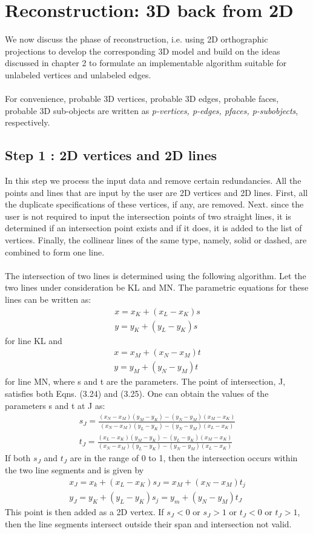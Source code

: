 \documentclass[
11pt, %
english, %
singlespacing, %
headsepline, %
]{MastersDoctoralThesis} %
\begin{document}
\section{Reconstruction: 3D back from 2D}
We now discuss the phase of reconstruction, i.e. using 2D orthographic projections to develop the corresponding 3D model and build on the ideas discussed in chapter 2 to formulate an implementable algorithm suitable for unlabeled vertices and unlabeled edges.\\ \\
 For convenience, probable 3D vertices, probable 3D edges, probable faces, probable 3D sub-objects are written as \emph{p-vertices, p-edges, pfaces,
p-subobjects}, respectively. 
\subsection{Step 1 : 2D vertices and 2D lines}
In this step we process the input data and remove certain redundancies. All the points and lines that are input by the user are 2D vertices and 2D lines. First, all the duplicate specifications of these vertices, if any,
are removed. Next. since the user is not required to input the intersection points of two straight lines, it is determined if an intersection point exists and if it does, it is added to the list of vertices. Finally, the collinear lines of the same type, namely, solid or dashed, are combined to form one line. \\ \\
The intersection of two lines is determined using the following algorithm. Let the two lines under consideration be KL and MN. The parametric equations
for these lines can be written as: 
\begin{align*}
x = x_K + (x_L - x_K)s \\
y = y_K + (y_L - y_K)s \tag{3.24}
\end{align*}
for line KL and
\begin{align*}
x = x_M + (x_N - x_M)t \\
y = y_M + (y_N - y_M)t \tag{3.25}
\end{align*}
for line MN, where s and t are the parameters. The point of intersection, J, satisfies both Eqns. (3.24) and (3.25). One can obtain the values of the  parameters s and t at J as: 
\begin{align*}
s_J = \frac{(x_N-x_M)(y_M-y_K)-(y_N-y_M)(x_M-x_K)}{(x_N-x_M)(y_L-y_K)-(y_N-y_M)(x_L-x_K)} \tag{3.26} \\
t_J = \frac{(x_L-x_K)(y_M-y_K)-(y_L-y_K)(x_M-x_K)}{(x_N-x_M)(y_L-y_K)-(y_N-y_M)(x_L-x_K)} \tag{3.27}
\end{align*}
If both $s_J$ and $t_J$ are in the range of 0 to 1, then the intersection occurs within the two line segments and is given by 
\begin{align*}
x_J = x_k + (x_L-x_K)s_J = x_M + (x_N - x_M)t_j \\
y_J = y_K + (y_L-y_K)s_j = y_m + (y_N - y_M)t_J \tag{3.28}
\end{align*}
This point is then added as a 2D vertex. If $s_J < 0$ or $s_J>1$ or $t_J<0$ or $t_J>1$, then the line segments intersect outside their span and intersection not valid.
\end{document}
